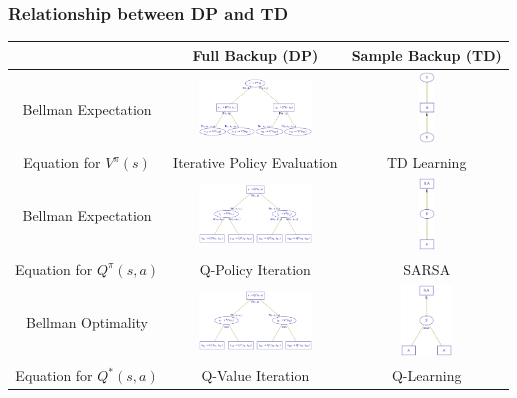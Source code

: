 \documentclass[handout]{beamer}
\begin{document}
\begin{frame}
\frametitle{Relationship between DP and TD}
\pause
      \begin{tabular}{c|c|c}
      & {\bf Full Backup (DP)} & {\bf Sample Backup (TD)} \\ \hline
       Bellman Expectation & \includegraphics[width=3.0cm, height=1.9cm]{mdp_bellman_policy_tree_vv.png}  & \includegraphics[width=0.5cm, height=1.9cm]{td.png} \\
               Equation for $V^{\pi}(s)$ & Iterative Policy Evaluation & TD Learning \\ \hline
        Bellman Expectation & \includegraphics[width=3.0cm, height=1.9cm]{mdp_bellman_policy_tree_qq.png} & \includegraphics[width=0.5cm, height=1.9cm]{sarsa.png} \\
               Equation for $Q^{\pi}(s, a)$ & Q-Policy Iteration & SARSA \\ \hline
          Bellman Optimality & \includegraphics[width=3.0cm, height=1.9cm]{mdp_bellman_opt_tree_qq.png} & \includegraphics[width=1.5cm, height=1.9cm]{q_learning.png} \\
               Equation for $Q^*(s, a)$ & Q-Value Iteration & Q-Learning \\         
      \end{tabular}  
\end{frame}
\end{document}
